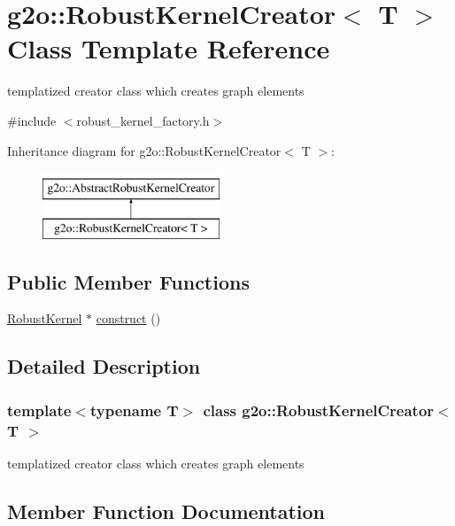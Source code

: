 \hypertarget{classg2o_1_1_robust_kernel_creator}{}\section{g2o\+:\+:Robust\+Kernel\+Creator$<$ T $>$ Class Template Reference}
\label{classg2o_1_1_robust_kernel_creator}


templatized creator class which creates graph elements  




{\ttfamily \#include $<$robust\+\_\+kernel\+\_\+factory.\+h$>$}

Inheritance diagram for g2o\+:\+:Robust\+Kernel\+Creator$<$ T $>$\+:\begin{figure}[H]
\begin{center}
\leavevmode
\includegraphics[height=2.000000cm]{classg2o_1_1_robust_kernel_creator}
\end{center}
\end{figure}
\subsection*{Public Member Functions}
\begin{DoxyCompactItemize}
\item 
\mbox{\hyperlink{classg2o_1_1_robust_kernel}{Robust\+Kernel}} $\ast$ \mbox{\hyperlink{classg2o_1_1_robust_kernel_creator_a6ab30adc017675641bd55502d7da0085}{construct}} ()
\end{DoxyCompactItemize}


\subsection{Detailed Description}
\subsubsection*{template$<$typename T$>$\newline
class g2o\+::\+Robust\+Kernel\+Creator$<$ T $>$}

templatized creator class which creates graph elements 

\subsection{Member Function Documentation}
\mbox{\label{classg2o_1_1_robust_kernel_creator_a6ab30adc017675641bd55502d7da0085}} 
